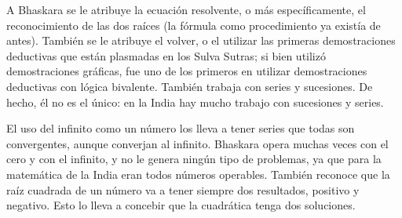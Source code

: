 A Bhaskara se le atribuye la ecuación resolvente, o más específicamente, el reconocimiento de las dos raíces (la fórmula como procedimiento ya existía de antes). También se le atribuye el volver, o el utilizar las primeras demostraciones deductivas que están plasmadas en los Sulva Sutras; si bien utilizó demostraciones gráficas, fue uno de los primeros en utilizar demostraciones deductivas con lógica bivalente. También trabaja con series y sucesiones. De hecho, él no es el único: en la India hay mucho trabajo con sucesiones y series. 

El uso del infinito como un número los lleva a tener series que todas son convergentes, aunque converjan al infinito. Bhaskara opera muchas veces con el cero y con el infinito, y no le genera ningún tipo de problemas, ya que para la matemática de la India eran todos números operables. También reconoce que la raíz cuadrada de un número va a tener siempre dos resultados, positivo y negativo. Esto lo lleva a concebir que la cuadrática tenga dos soluciones.
